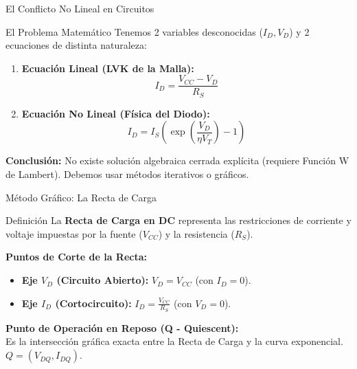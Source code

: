 \documentclass[10pt, aspectratio=169]{beamer}
\begin{document}
\begin{frame}{El Conflicto No Lineal en Circuitos}
  \begin{block}{El Problema Matemático}
    Tenemos 2 variables desconocidas ($I_D, V_D$) y 2 ecuaciones de distinta naturaleza:
  \end{block}
  \vspace{0.3cm}
  \begin{enumerate}
      \item \textbf{Ecuación Lineal (LVK de la Malla):}
      \begin{equation*}
          I_D = \frac{V_{CC} - V_D}{R_S}
      \end{equation*}
      \item \textbf{Ecuación No Lineal (Física del Diodo):}
      \begin{equation*}
          I_D = I_S \left( \exp\left(\frac{V_D}{\eta V_T}\right) - 1 \right)
      \end{equation*}
  \end{enumerate}
  \vspace{0.3cm}
  \alert{\textbf{Conclusión:}} No existe solución algebraica cerrada explícita (requiere Función W de Lambert). Debemos usar métodos iterativos o gráficos.
\end{frame}

\begin{frame}{Método Gráfico: La Recta de Carga}
  \begin{block}{Definición}
      La \textbf{Recta de Carga en DC} representa las restricciones de corriente y voltaje impuestas por la fuente ($V_{CC}$) y la resistencia ($R_S$).
  \end{block}
  
  \vspace{0.3cm}
  \textbf{Puntos de Corte de la Recta:}
  \begin{itemize}
      \item \textbf{Eje $V_D$ (Circuito Abierto):} $V_D = V_{CC}$ (con $I_D = 0$).
      \item \textbf{Eje $I_D$ (Cortocircuito):} $I_D = \frac{V_{CC}}{R_S}$ (con $V_D = 0$).
  \end{itemize}
  
  \vspace{0.3cm}
  \alert{\textbf{Punto de Operación en Reposo (Q - Quiescent):}} \\
  Es la intersección gráfica exacta entre la Recta de Carga y la curva exponencial. $Q = (V_{DQ}, I_{DQ})$.
\end{frame}
\end{document}
